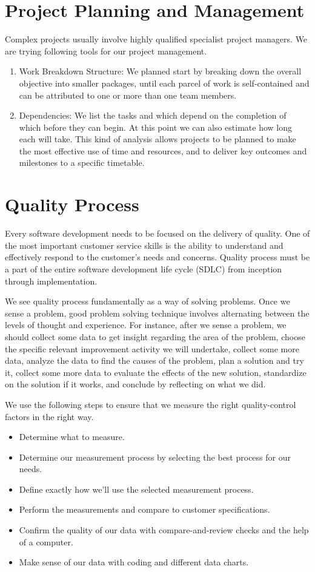 \documentclass{article}%
\begin{document}
\section{Project Planning and Management}
Complex projects usually involve highly qualified specialist project managers. We are trying following tools for our project management.
\begin{enumerate}
\item Work Breakdown Structure: 
We planned start by breaking down the overall objective into smaller packages, until each parcel 
of work is self-contained and can be attributed to one or more than one team members.
\item Dependencies: 
We list the tasks and which depend on the completion of which before they can begin. At this 
point we can also estimate how long each will take. 
This kind of analysis allows projects to be planned to make the most effective use of time and 
resources, and to deliver key outcomes and milestones to a specific timetable. 
\end{enumerate}

\section{Quality Process}
Every software development needs to be focused on the delivery of quality. One of the most important customer service skills is the ability to understand and effectively respond to the customer’s needs and concerns. Quality process must be a part of the entire software development life cycle (SDLC) from inception through implementation.

We see quality process fundamentally as a way of solving problems. Once we sense a problem, good problem solving technique involves alternating between the levels of thought and experience. For instance, after we sense a problem, we should collect some data to get insight regarding the area of the problem,
choose the specific relevant improvement activity we will undertake, collect some more
data, analyze the data to find the causes of the problem, plan a solution and try it, collect
some more data to evaluate the effects of the new solution, standardize on the solution if
it works, and conclude by reflecting on what we did.

We use the following steps to ensure that we measure the right quality-control factors in the right way.
\begin{itemize}
\item Determine what to measure.
\item Determine our measurement process by selecting the best process for our needs.
\item Define exactly how we'll use the selected measurement process.
\item Perform the measurements and compare to customer specifications.
\item Confirm the quality of our data with compare-and-review checks and the help of a computer.
\item Make sense of our data with coding and different data charts.
\end{itemize}
\end{document}
